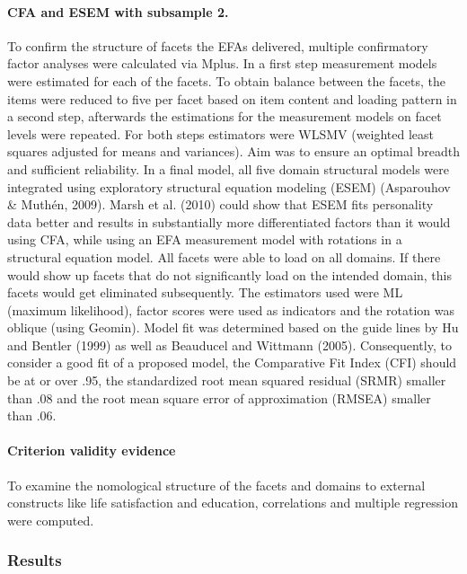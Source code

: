 \documentclass[man]{apa6}
\theoremstyle{definition}
\theoremstyle{definition}
\theoremstyle{definition}
\theoremstyle{remark}
\begin{document}
\hypertarget{cfa-and-esem-with-subsample-2.}{%
\paragraph{CFA and ESEM with subsample
2.}\label{cfa-and-esem-with-subsample-2.}}

To confirm the structure of facets the EFAs delivered, multiple
confirmatory factor analyses were calculated via Mplus. In a first step
measurement models were estimated for each of the facets. To obtain
balance between the facets, the items were reduced to five per facet
based on item content and loading pattern in a second step, afterwards
the estimations for the measurement models on facet levels were
repeated. For both steps estimators were WLSMV (weighted least squares
adjusted for means and variances). Aim was to ensure an optimal breadth
and sufficient reliability. In a final model, all five domain structural
models were integrated using exploratory structural equation modeling
(ESEM) (Asparouhov \& Muthén, 2009). Marsh et al. (2010) could show that
ESEM fits personality data better and results in substantially more
differentiated factors than it would using CFA, while using an EFA
measurement model with rotations in a structural equation model. All
facets were able to load on all domains. If there would show up facets
that do not significantly load on the intended domain, this facets would
get eliminated subsequently. The estimators used were ML (maximum
likelihood), factor scores were used as indicators and the rotation was
oblique (using Geomin). Model fit was determined based on the guide
lines by Hu and Bentler (1999) as well as Beauducel and Wittmann (2005).
Consequently, to consider a good fit of a proposed model, the
Comparative Fit Index (CFI) should be at or over .95, the standardized
root mean squared residual (SRMR) smaller than .08 and the root mean
square error of approximation (RMSEA) smaller than .06.

\hypertarget{criterion-validity-evidence}{%
\paragraph{Criterion validity
evidence}\label{criterion-validity-evidence}}

To examine the nomological structure of the facets and domains to
external constructs like life satisfaction and education, correlations
and multiple regression were computed.

\hypertarget{results}{%
\subsubsection{Results}\label{results}}
\end{document}
